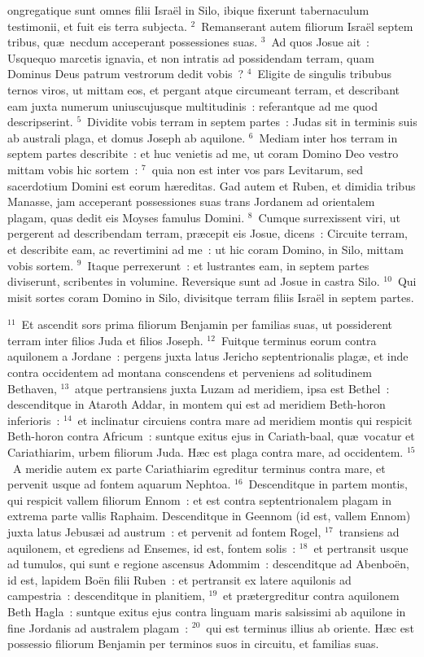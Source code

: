 \bchapter
{}ongregatique sunt omnes filii Isra\"el in Silo, ibique fixerunt tabernaculum testimonii, et fuit eis terra subjecta.
${}^{2}$~Remanserant autem filiorum Isra\"el septem tribus, qu\ae\ necdum acceperant possessiones suas.
${}^{3}$~Ad quos Josue ait~: Usquequo marcetis ignavia, et non intratis ad possidendam terram, quam Dominus Deus patrum vestrorum dedit vobis~?
${}^{4}$~Eligite de singulis tribubus ternos viros, ut mittam eos, et pergant atque circumeant terram, et describant eam juxta numerum uniuscujusque multitudinis~: referantque ad me quod descripserint.
${}^{5}$~Dividite vobis terram in septem partes~: Judas sit in terminis suis ab australi plaga, et domus Joseph ab aquilone.
${}^{6}$~Mediam inter hos terram in septem partes describite~: et huc venietis ad me, ut coram Domino Deo vestro mittam vobis hic sortem~:
${}^{7}$~quia non est inter vos pars Levitarum, sed sacerdotium Domini est eorum h\ae reditas. Gad autem et Ruben, et dimidia tribus Manasse, jam acceperant possessiones suas trans Jordanem ad orientalem plagam, quas dedit eis Moyses famulus Domini.
${}^{8}$~Cumque surrexissent viri, ut pergerent ad describendam terram, pr\ae cepit eis Josue, dicens~: Circuite terram, et describite eam, ac revertimini ad me~: ut hic coram Domino, in Silo, mittam vobis sortem.
${}^{9}$~Itaque perrexerunt~: et lustrantes eam, in septem partes diviserunt, scribentes in volumine. Reversique sunt ad Josue in castra Silo.
${}^{10}$~Qui misit sortes coram Domino in Silo, divisitque terram filiis Isra\"el in septem partes.


${}^{11}$~Et ascendit sors prima filiorum Benjamin per familias suas, ut possiderent terram inter filios Juda et filios Joseph.
${}^{12}$~Fuitque terminus eorum contra aquilonem a Jordane~: pergens juxta latus Jericho septentrionalis plag\ae , et inde contra occidentem ad montana conscendens et perveniens ad solitudinem Bethaven,
${}^{13}$~atque pertransiens juxta Luzam ad meridiem, ipsa est Bethel~: descenditque in Ataroth Addar, in montem qui est ad meridiem Beth-horon inferioris~:
${}^{14}$~et inclinatur circuiens contra mare ad meridiem montis qui respicit Beth-horon contra Africum~: suntque exitus ejus in Cariath-baal, qu\ae\ vocatur et Cariathiarim, urbem filiorum Juda. H\ae c est plaga contra mare, ad occidentem.
${}^{15}$~A meridie autem ex parte Cariathiarim egreditur terminus contra mare, et pervenit usque ad fontem aquarum Nephtoa.
${}^{16}$~Descenditque in partem montis, qui respicit vallem filiorum Ennom~: et est contra septentrionalem plagam in extrema parte vallis Raphaim. Descenditque in Geennom (id est, vallem Ennom) juxta latus Jebus\ae i ad austrum~: et pervenit ad fontem Rogel,
${}^{17}$~transiens ad aquilonem, et egrediens ad Ensemes, id est, fontem solis~:
${}^{18}$~et pertransit usque ad tumulos, qui sunt e regione ascensus Adommim~: descenditque ad Abenbo\"en, id est, lapidem Bo\"en filii Ruben~: et pertransit ex latere aquilonis ad campestria~: descenditque in planitiem,
${}^{19}$~et pr\ae tergreditur contra aquilonem Beth Hagla~: suntque exitus ejus contra linguam maris salsissimi ab aquilone in fine Jordanis ad australem plagam~:
${}^{20}$~qui est terminus illius ab oriente. H\ae c est possessio filiorum Benjamin per terminos suos in circuitu, et familias suas.


